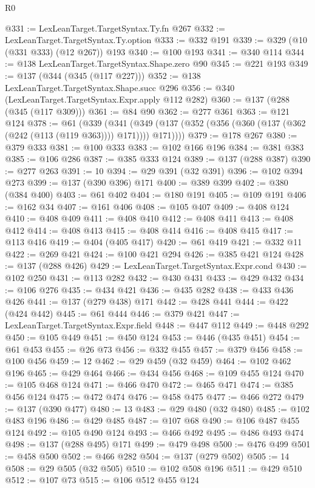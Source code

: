 \begin{lexlean}{R0}
\begin{coremodule}
@331 := LexLeanTarget.TargetSyntax.Ty.fn @267
@332 := LexLeanTarget.TargetSyntax.Ty.option
@333 := @332 @191
@339 := @329 (@10 (@331 @333) (@12 @267)) @193
@340 := @100 @193
@341 := @340 @114
@344 := @138 LexLeanTarget.TargetSyntax.Shape.zero @90
@345 := @221 @193
@349 := @137 (@344 (@345 (@117 @227)))
@352 := @138 LexLeanTarget.TargetSyntax.Shape.succ @296
@356 := @340 (LexLeanTarget.TargetSyntax.Expr.apply @112 @282)
@360 := @137 (@288 (@345 (@117 @309)))
@361 := @84 @90
@362 := @277 @361
@363 := @121 @124
@378 := @61
    (@339
      (@341 (@349 (@137 (@352 (@356 (@360 (@137 (@362 (@242 (@113 (@119 @363)))) @171)))) @171))))
@379 := @178 @267
@380 := @379 @333
@381 := @100 @333
@383 := @102 @166 @196
@384 := @381 @383
@385 := @106 @286
@387 := @385 @333 @124
@389 := @137 (@288 @387)
@390 := @277 @263
@391 := 10
@394 := @29 @391 (@32 @391)
@396 := @102 @394 @273
@399 := @137 (@390 @396) @171
@400 := @389 @399
@402 := @380 (@384 @400)
@403 := @61 @402
@404 := @180 @191
@405 := @109 @191
@406 := @162 @34
@407 := @161 @406
@408 := @105 @407
@409 := @408 @124
@410 := @408 @409
@411 := @408 @410
@412 := @408 @411
@413 := @408 @412
@414 := @408 @413
@415 := @408 @414
@416 := @408 @415
@417 := @113 @416
@419 := @404 (@405 @417)
@420 := @61 @419
@421 := @332 @11
@422 := @269 @421
@424 := @100 @421 @294
@426 := @385 @421 @124
@428 := @137 (@288 @426)
@429 := LexLeanTarget.TargetSyntax.Expr.cond
@430 := @102 @250
@431 := @113 @282
@432 := @430 @431
@433 := @429 @432
@434 := @106 @276
@435 := @434 @421
@436 := @435 @282
@438 := @433 @436 @426
@441 := @137 (@279 @438) @171
@442 := @428 @441
@444 := @422 (@424 @442)
@445 := @61 @444
@446 := @379 @421
@447 := LexLeanTarget.TargetSyntax.Expr.field
@448 := @447 @112
@449 := @448 @292
@450 := @105 @449
@451 := @450 @124
@453 := @446 (@435 @451)
@454 := @61 @453
@455 := @26 @73
@456 := @332 @455
@457 := @379 @456
@458 := @100 @456
@459 := 12
@462 := @29 @459 (@32 @459)
@464 := @102 @462 @196
@465 := @429 @464
@466 := @434 @456
@468 := @109 @455 @124
@470 := @105 @468 @124
@471 := @466 @470
@472 := @465 @471
@474 := @385 @456 @124
@475 := @472 @474
@476 := @458 @475
@477 := @466 @272
@479 := @137 (@390 @477)
@480 := 13
@483 := @29 @480 (@32 @480)
@485 := @102 @483 @196
@486 := @429 @485
@487 := @107 @68
@490 := @106 @487 @455 @124
@492 := @105 @490 @124
@493 := @466 @492
@495 := @486 @493 @474
@498 := @137 (@288 @495) @171
@499 := @479 @498
@500 := @476 @499
@501 := @458 @500
@502 := @466 @282
@504 := @137 (@279 @502)
@505 := 14
@508 := @29 @505 (@32 @505)
@510 := @102 @508 @196
@511 := @429 @510
@512 := @107 @73
@515 := @106 @512 @455 @124

\end{coremodule}
\end{lexlean}
